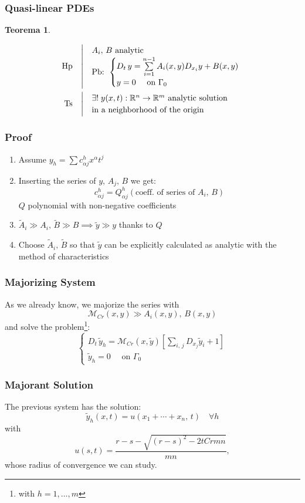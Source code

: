\documentclass[serif,notheorems]{beamer}
\makeatletter
\newenvironment{ipotesi}%
{\quad\left|\quad\def\arraystretch{1.2}\begin{array}{@{}l@{}}}%
{\end{array}\right.}
\newcommand{\hpth}[2]
{
\begin{align*}
\quad
\text{Hp}
&\begin{ipotesi}
#1
\end{ipotesi}\\
\text{Ts}
&\begin{ipotesi}
#2
\end{ipotesi}
\end{align*}
}
\theoremstyle{definition} %
\newtheorem{theorem}{Teorema}[section] %
\theoremstyle{remark}
\makeatother
\begin{document}
\begin{frame}
\frametitle{Quasi-linear PDEs}
\begin{theorem}\label{teoquasilin}
\hpth{
A_i , \, B\text{ analytic }\\
\text{Pb: }
\begin{cases}
D_t \, y = \sum\limits_{i=1}^{n-1} A_i(x,y)D_{x_i}y+B(x,y) \; \\
y=0 \quad \text{ on } \Gamma_0
\end{cases}
\\
}{
\exists ! \; y(x,t): \mathbb{R}^n \rightarrow \mathbb{R}^m
\text{ analytic solution } \\ \text{in a neighborhood of the origin}
}
\end{theorem}
\end{frame}

\begin{frame}
\frametitle{Proof}
\begin{enumerate}
\item Assume $y_h = \sum c^h_{\alpha j} x^\alpha t^j$
\item Inserting the series of $y,\, A_j,\, B$ we get: 
$$ c^h_{\alpha j} = Q^h_{\alpha j}(\text{coeff. of series of }A_i, \, B)$$
$Q$ polynomial with non-negative coefficients
\item $\widetilde{A}_i \gg A_i, \, \widetilde{B} \gg B \implies \widetilde{y} \gg y$ thanks to $Q$
\item Choose $\widetilde{A}_i, \, \widetilde{B}$ so that $\widetilde{y}$ can be explicitly calculated as analytic with the method of characteristics
\end{enumerate}
\end{frame}

\begin{frame}
\frametitle{Majorizing System}
As we already know, we majorize the series with 
$$\mathcal{M}_{Cr}(x,y) \gg A_i(x,y),\, B(x,y)$$
and solve the problem\footnote{with $h=1,\ldots, m$}:
\begin{equation*}
\begin{cases}
D_t \, \widetilde{y}_h = \mathcal{M}_{Cr} (x,\widetilde{y})\left[\sum\limits_{i,\, j} D_{x_j}\widetilde{y}_i+1 \right] \\
\widetilde{y}_h=0 \quad \text{ on } \Gamma_0
\end{cases}
\end{equation*}
\end{frame}

\begin{frame}
\frametitle{Majorant Solution}
The previous system has the solution:
$$\widetilde{y}_h(x,t)=u(x_1+\cdots +x_n,\,t) \quad \forall h$$
with
$$u(s,t)=\frac{r-s-\sqrt{(r-s)^2-2tCrmn}}{mn},$$
whose radius of convergence we can study.
\end{frame}
\end{document}
